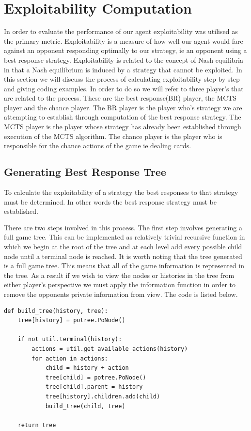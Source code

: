 \section{Exploitability Computation}\label{sec:bestResponseComputation}
In order to evaluate the performance of our agent exploitability was utilised as the primary metric.
Exploitability is a measure of how well our agent would fare against an opponent responding
optimally to our strategy, ie an opponent using a best response strategy.
Exploitability is related to the concept of Nash equilibria in that a Nash equilibrium
is induced by a strategy that cannot be exploited.
In this section we will discuss the process of calculating exploitability step by step and giving coding examples.
In order to do so we will refer to three player's that are related to the process.
These are the best response(BR) player, the MCTS player and the chance player.
The BR player is the player who's strategy we are attempting to establish through computation
of the best response strategy.
The MCTS player is the player whose strategy has already been established through execution of the MCTS algorithm.
The chance player is the player who is responsible for the chance actions of the game ie dealing cards.

\subsection{Generating Best Response Tree}\label{subsec:applyMCTS}
To calculate the exploitability of a strategy the best responses to that strategy must be
determined.
In other words the best response strategy must be established.

There are two steps involved in this process.
The first step involves generating a full game tree.
This can be implemented as relatively trivial recursive function in which we begin at the root of the
tree and at each level add every possible child node until a terminal node is reached.
It is worth noting that the tree generated is a full game tree.
This means that all of the game information is represented in the tree.
As a result if we wish to view the nodes or histories in the tree from either player's perspective we must apply
the information function in order to remove the opponents private information from view.
The code is listed below.

\begin{lstlisting}[style=Python]
def build_tree(history, tree):
    tree[history] = potree.PoNode()

    if not util.terminal(history):
        actions = util.get_available_actions(history)
        for action in actions:
            child = history + action
            tree[child] = potree.PoNode()
            tree[child].parent = history
            tree[history].children.add(child)
            build_tree(child, tree)

    return tree
\end{lstlisting}

